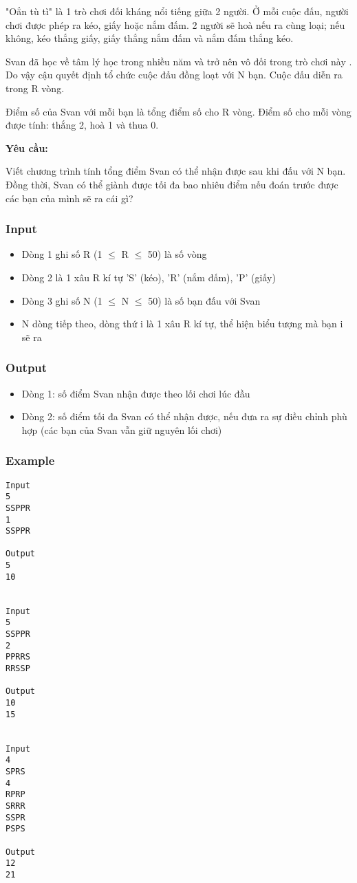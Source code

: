 

"Oẳn tù tì" là 1 trò chơi đối kháng nổi tiếng giữa 2 người. Ở mỗi cuộc đấu, người chơi được phép ra kéo, giấy hoặc nắm đấm. 2 người sẽ hoà nếu ra cùng loại; nếu không, kéo thắng giấy, giấy thắng nắm đấm và nắm đấm thắng kéo.

Svan đã học về tâm lý học trong nhiều năm và trở nên vô đối trong trò chơi này . Do vậy cậu quyết định tổ chức cuộc đấu đồng loạt với N bạn. Cuộc đấu diễn ra trong R vòng.

Điểm số của Svan với mỗi bạn là tổng điểm số cho R vòng. Điểm số cho mỗi vòng được tính: thắng 2, hoà 1 và thua 0.

\textbf{Yêu cầu:}

Viết chương trình tính tổng điểm Svan có thể nhận được sau khi đấu với N bạn. Đồng thời, Svan có thể giành được tối đa bao nhiêu điểm nếu đoán trước được các bạn của mình sẽ ra cái gì?

\subsubsection{Input}
\begin{itemize}
	\item Dòng 1 ghi số R (1  $\le$  R  $\le$  50) là số vòng
	\item Dòng 2 là 1 xâu R kí tự 'S' (kéo), 'R' (nắm đấm), 'P' (giấy)
	\item Dòng 3 ghi số N (1  $\le$  N  $\le$  50) là số bạn đấu với Svan
	\item N dòng tiếp theo, dòng thứ i là 1 xâu R kí tự, thể hiện biểu tượng mà bạn i sẽ ra
\end{itemize}

\subsubsection{Output}
\begin{itemize}
	\item Dòng 1: số điểm Svan nhận được theo lối chơi lúc đầu
	\item Dòng 2: số điểm tối đa Svan có thể nhận được, nếu đưa ra sự điều chỉnh phù hợp (các bạn của Svan vẫn giữ nguyên lối chơi)
\end{itemize}

\subsubsection{Example}
\begin{verbatim}
Input
5
SSPPR
1
SSPPR

Output
5
10


Input
5
SSPPR
2
PPRRS
RRSSP

Output
10
15


Input
4
SPRS
4
RPRP
SRRR
SSPR
PSPS

Output
12
21
\end{verbatim}

